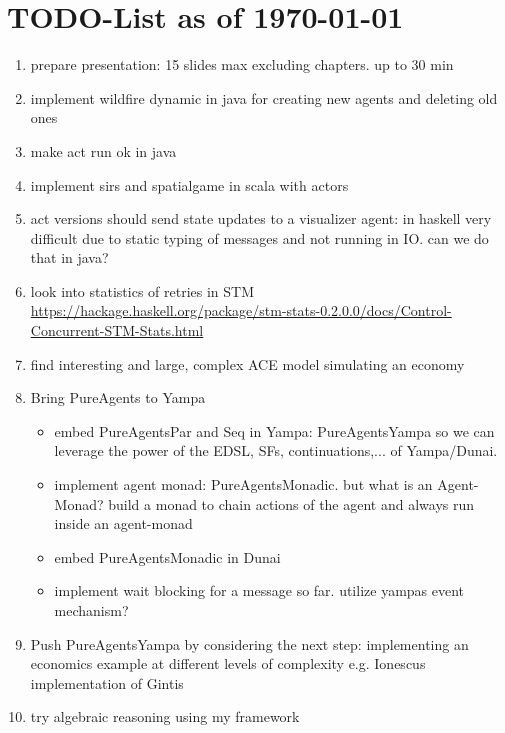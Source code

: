 \section{TODO-List as of \today}

\begin{enumerate}
\item prepare presentation: 15 slides max excluding chapters. up to 30 min

\item implement wildfire dynamic in java for creating new agents and deleting old ones

\item make act run ok in java

\item implement sirs and spatialgame in scala with actors

\item act versions should send state updates to a visualizer agent: in haskell very difficult due to static typing of messages and not running in IO. can we do that in java?

\item look into statistics of retries in STM \url{https://hackage.haskell.org/package/stm-stats-0.2.0.0/docs/Control-Concurrent-STM-Stats.html}

\item find interesting and large, complex ACE model simulating an economy

\item Bring PureAgents to Yampa
	\begin{itemize}
		\item embed PureAgentsPar and Seq in Yampa: PureAgentsYampa so we can leverage the power of the EDSL, SFs, continuations,... of Yampa/Dunai.
		\item implement agent monad: PureAgentsMonadic. but what is an Agent-Monad? build a monad to chain actions of the agent and always run inside an agent-monad
		\item embed PureAgentsMonadic in Dunai
		\item implement wait blocking for a message so far. utilize yampas event mechanism?
	\end{itemize}
	
\item Push PureAgentsYampa by considering the next step: implementing an economics example at different levels of complexity e.g. Ionescus implementation of Gintis

\item try algebraic reasoning using my framework


\end{enumerate}
